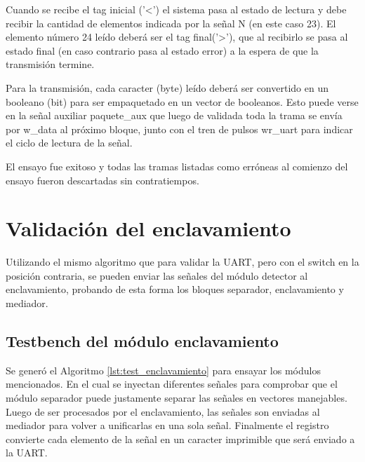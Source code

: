 		Cuando se recibe el tag inicial ('<') el sistema pasa al estado de lectura y debe recibir la cantidad de elementos indicada por la señal N (en este caso 23). El elemento número 24 leído deberá ser el tag final('>'), que al recibirlo se pasa al estado final (en caso contrario pasa al estado error) a la espera de que la transmisión termine.
		
		Para la transmisión, cada caracter (byte) leído deberá ser convertido en un booleano (bit) para ser empaquetado en un vector de booleanos. Esto puede verse en la señal auxiliar paquete\_aux que luego de validada toda la trama se envía por w\_data al próximo bloque, junto con el tren de pulsos wr\_uart para indicar el ciclo de lectura de la señal.
		
		El ensayo fue exitoso y todas las tramas listadas como erróneas al comienzo del ensayo fueron descartadas sin contratiempos.
		
\section{Validación del enclavamiento}	

	Utilizando el mismo algoritmo que para validar la UART, pero con el switch en la posición contraria, se pueden enviar las señales del módulo detector al enclavamiento, probando de esta forma los bloques separador, enclavamiento y mediador.
	
	\subsection{Testbench del módulo enclavamiento}
			
		Se generó el Algoritmo \ref{lst:test_enclavamiento} para ensayar los módulos mencionados. En el cual se inyectan diferentes señales para comprobar que el módulo separador puede justamente separar las señales en vectores manejables. Luego de ser procesados por el enclavamiento, las señales son enviadas al mediador para volver a unificarlas en una sola señal. Finalmente el registro convierte cada elemento de la señal en un caracter imprimible que será enviado a la UART.		
			
